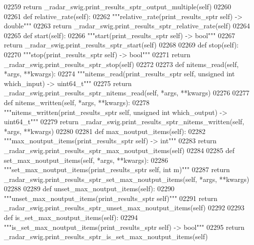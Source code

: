 \begin{DoxyCode}
{{{{{{{{{02259         \textcolor{keywordflow}{return} \_radar\_swig.print\_results\_sptr\_output\_multiple(self)
02260 
02261     \textcolor{keyword}{def }relative_rate(self):
02262         \textcolor{stringliteral}{"""relative\_rate(print\_results\_sptr self) -> double"""}
02263         \textcolor{keywordflow}{return} \_radar\_swig.print\_results\_sptr\_relative\_rate(self)
02264 
02265     \textcolor{keyword}{def }start(self):
02266         \textcolor{stringliteral}{"""start(print\_results\_sptr self) -> bool"""}
02267         \textcolor{keywordflow}{return} \_radar\_swig.print\_results\_sptr\_start(self)
02268 
02269     \textcolor{keyword}{def }stop(self):
02270         \textcolor{stringliteral}{"""stop(print\_results\_sptr self) -> bool"""}
02271         \textcolor{keywordflow}{return} \_radar\_swig.print\_results\_sptr\_stop(self)
02272 
02273     \textcolor{keyword}{def }nitems_read(self, *args, **kwargs):
02274         \textcolor{stringliteral}{"""nitems\_read(print\_results\_sptr self, unsigned int which\_input) -> uint64\_t"""}
02275         \textcolor{keywordflow}{return} \_radar\_swig.print\_results\_sptr\_nitems\_read(self, *args, **kwargs)
02276 
02277     \textcolor{keyword}{def }nitems_written(self, *args, **kwargs):
02278         \textcolor{stringliteral}{"""nitems\_written(print\_results\_sptr self, unsigned int which\_output) -> uint64\_t"""}
02279         \textcolor{keywordflow}{return} \_radar\_swig.print\_results\_sptr\_nitems\_written(self, *args, **kwargs)
02280 
02281     \textcolor{keyword}{def }max_noutput_items(self):
02282         \textcolor{stringliteral}{"""max\_noutput\_items(print\_results\_sptr self) -> int"""}
02283         \textcolor{keywordflow}{return} \_radar\_swig.print\_results\_sptr\_max\_noutput\_items(self)
02284 
02285     \textcolor{keyword}{def }set_max_noutput_items(self, *args, **kwargs):
02286         \textcolor{stringliteral}{"""set\_max\_noutput\_items(print\_results\_sptr self, int m)"""}
02287         \textcolor{keywordflow}{return} \_radar\_swig.print\_results\_sptr\_set\_max\_noutput\_items(self, *args, **kwargs)
02288 
02289     \textcolor{keyword}{def }unset_max_noutput_items(self):
02290         \textcolor{stringliteral}{"""unset\_max\_noutput\_items(print\_results\_sptr self)"""}
02291         \textcolor{keywordflow}{return} \_radar\_swig.print\_results\_sptr\_unset\_max\_noutput\_items(self)
02292 
02293     \textcolor{keyword}{def }is_set_max_noutput_items(self):
02294         \textcolor{stringliteral}{"""is\_set\_max\_noutput\_items(print\_results\_sptr self) -> bool"""}
02295         \textcolor{keywordflow}{return} \_radar\_swig.print\_results\_sptr\_is\_set\_max\_noutput\_items(self)
}}}}}}}}}
\end{DoxyCode}

